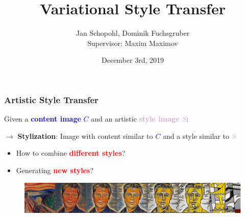 \documentclass[11pt,xcolor=dvipsnames]{beamer}
\author[Jan Schopohl, Dominik Fuchsgruber]{Jan Schopohl, Dominik Fuchsgruber \\[10mm]{\small Supervisor: Maxim Maximov}}
\title{Variational Style Transfer}
\date{December 3rd, 2019}
\institute{Department of Informatics, Technical University of Munich}
\begin{document}
\begin{frame}
\titlepage
\end{frame}



\begin{frame}
	
\frametitle{Artistic Style Transfer}


\begin{multicols*}{2}
\begin{large}
Given a \textcolor{blue}{\textbf{content image} $C$} and an artistic \textcolor{Plum}{\textbf{style image $S$}}: 


\vspace{10pt}

$\rightarrow$ \textbf{Stylization}: Image with content similar to \textcolor{blue}{\textbf{$C$}} and a style similar to \textcolor{Plum}{\textbf{$S$}} 

\vspace{20pt}
\begin{itemize}
\item How to combine \textcolor{red}{\textbf{different styles}}?
\vspace{10pt}
\item Generating \textcolor{red}{\textbf{new styles}}?
\end{itemize}
\end{large}

\begin{figure}
\includegraphics[scale=0.2]{interpolation.png}
\end{figure}

\columnbreak


\end{multicols*}
\end{frame}
\end{document}
